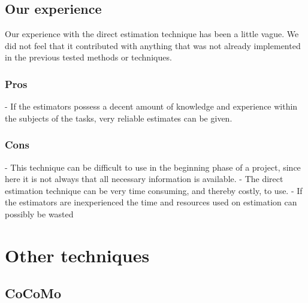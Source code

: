 \subsection{Our experience}
Our experience with the direct estimation technique has been a little vague. We did not feel that it contributed with anything that was not already implemented in the previous tested methods or techniques.

\subsubsection{Pros}
- If the estimators possess a decent amount of knowledge and experience within the subjects of the tasks, very reliable estimates can be given. 

\subsubsection{Cons}
- This technique can be difficult to use in the beginning phase of a project, since here it is not always that all necessary information is available.
- The direct estimation technique can be very time consuming, and thereby costly, to use.
- If the estimators are inexperienced the time and resources used on estimation can possibly be wasted

\section{Other techniques}
\subsection{CoCoMo}



















